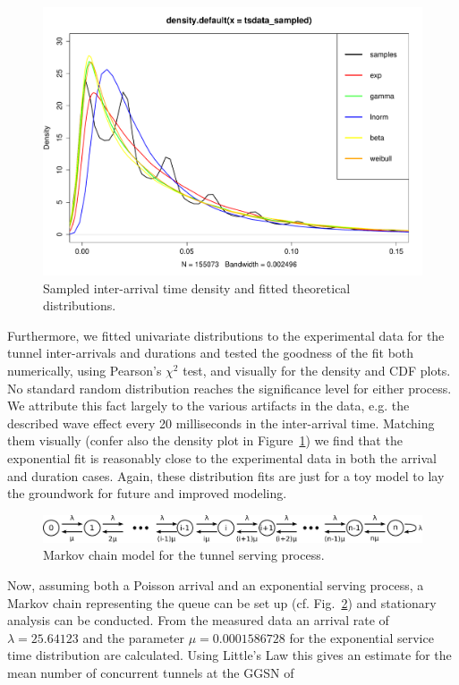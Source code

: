 \begin{figure}
	\centering
	\includegraphics[width=\columnwidth]{images/IMC2013/R-IAT-densities.pdf}
	\caption{Sampled inter-arrival time density and fitted theoretical distributions.}
	\label{fig:IAT-densities}
\end{figure}

Furthermore, we fitted univariate distributions to the experimental data for the tunnel inter-arrivals and durations and tested the goodness of the fit both numerically, using Pearson's $\chi^2$ test, and visually for the density and CDF plots. No standard random distribution reaches the significance level for either process. We attribute this fact largely to the various artifacts in the data, e.g. the described wave effect every 20 milliseconds in the inter-arrival time. Matching them visually (confer also the density plot in Figure~\ref{fig:IAT-densities}) we find that the exponential fit is reasonably close to the experimental data in both the arrival and duration cases. Again, these distribution fits are just for a toy model to lay the groundwork for future and improved modeling.


\begin{figure}
	\centering
	\includegraphics[width=\columnwidth]{images/IMC2013/markovchain.pdf}
	\caption{Markov chain model for the tunnel serving process.}
	\label{fig:markovchain}
\end{figure}

Now, assuming both a Poisson arrival and an exponential serving process, a Markov chain representing the queue can be set up (cf. Fig.~\ref{fig:markovchain}) and stationary analysis can be conducted. From the measured data an arrival rate of $\lambda=25.64123$ and the parameter $\mu=0.0001586728$ for the exponential service time distribution are calculated. Using Little's Law this gives an estimate for the mean number of concurrent tunnels at the \ac{GGSN} of 


